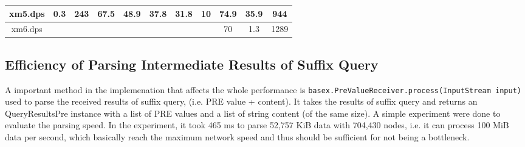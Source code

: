 \begin{table}[]
\begin{tabular}{|c|c|c|c|c|c|c|c|c|c|c|}
		xm5.dps              & 0.3                                                                   & 243 & 67.5 & 48.9 & 37.8 & 31.8 & 10                                                                    & 74.9                                                                    & 35.9               & 944          \\ \hline
		xm6.dps              &                                                                       &     &      &      &      &      &                                                                       & 70                                                                      & 1.3                & 1289         \\ \hline
	\end{tabular}
\end{table}


 
%
%


\subsection{Efficiency of Parsing Intermediate Results of Suffix Query}
A important method in the implemenation that affects the whole performance is 
\texttt{basex.PreValueReceiver.process(InputStream input)} used 
to parse the received results of suffix query, (i.e. PRE value + 
content). It takes the results of suffix query and returns an 
QueryResultsPre instance with a list of PRE values and a list of 
string content (of the same size). A simple experiment were done to evaluate 
the parsing speed. In the experiment, it took 465 ms to parse 
52,757 KiB data with 704,430 nodes, i.e. it can process 100 MiB 
data per second, which basically reach the maximum network 
speed and thus should be sufficient for not being a bottleneck.




